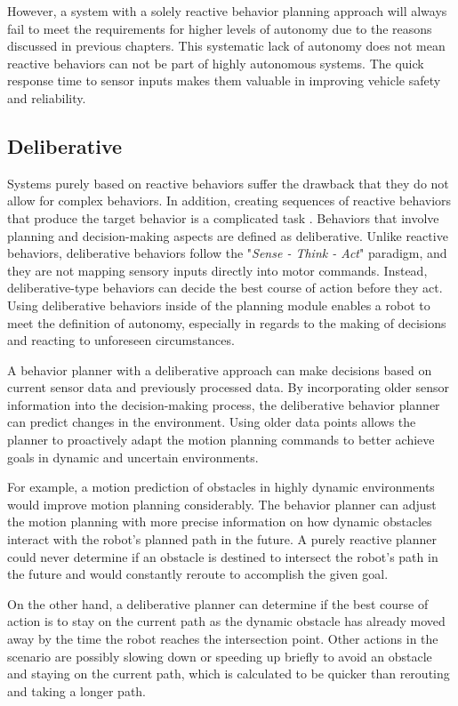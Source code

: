 However, a system with a solely reactive behavior planning approach will always fail to meet the requirements for higher levels of autonomy due to the reasons discussed in previous chapters. This systematic lack of autonomy does not mean reactive behaviors can not be part of highly autonomous systems. The quick response time to sensor inputs makes them valuable in improving vehicle safety and reliability. 

\subsection{Deliberative}

Systems purely based on reactive behaviors suffer the drawback that they do not allow for complex behaviors. In addition, creating sequences of reactive behaviors that produce the target behavior is a complicated task \cite{murphy2000}. Behaviors that involve planning and decision-making aspects are defined as deliberative. Unlike reactive behaviors, deliberative behaviors follow the "\textit{Sense - Think - Act}" paradigm, and they are not mapping sensory inputs directly into motor commands. Instead, deliberative-type behaviors can decide the best course of action before they act. Using deliberative behaviors inside of the planning module enables a robot to meet the definition of autonomy, especially in regards to the making of decisions and reacting to unforeseen circumstances. 

A behavior planner with a deliberative approach can make decisions based on current sensor data and previously processed data. By incorporating older sensor information into the decision-making process, the deliberative behavior planner can predict changes in the environment. Using older data points allows the planner to proactively adapt the motion planning commands to better achieve goals in dynamic and uncertain environments. 

For example, a motion prediction of obstacles in highly dynamic environments would improve motion planning considerably. The behavior planner can adjust the motion planning with more precise information on how dynamic obstacles interact with the robot's planned path in the future. A purely reactive planner could never determine if an obstacle is destined to intersect the robot's path in the future and would constantly reroute to accomplish the given goal.

On the other hand, a deliberative planner can determine if the best course of action is to stay on the current path as the dynamic obstacle has already moved away by the time the robot reaches the intersection point. Other actions in the scenario are possibly slowing down or speeding up briefly to avoid an obstacle and staying on the current path, which is calculated to be quicker than rerouting and taking a longer path. 


